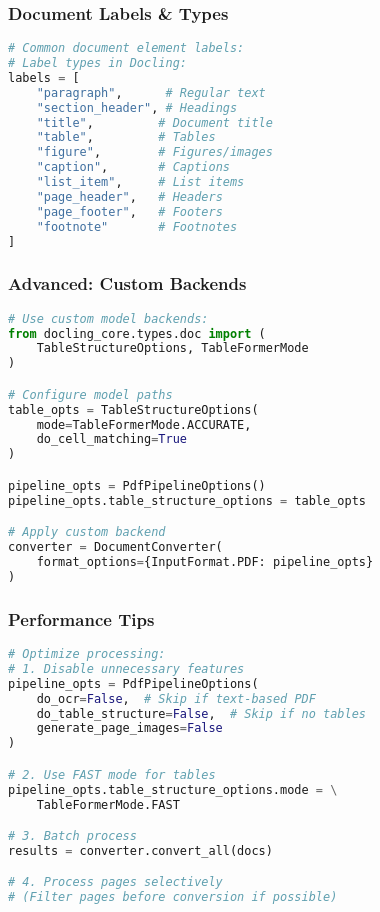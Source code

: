 \begin{frame}[fragile]\frametitle{Document Labels \& Types}
\begin{lstlisting}[language=python,basicstyle=\tiny]
# Common document element labels:
# Label types in Docling:
labels = [
    "paragraph",      # Regular text
    "section_header", # Headings
    "title",         # Document title
    "table",         # Tables
    "figure",        # Figures/images
    "caption",       # Captions
    "list_item",     # List items
    "page_header",   # Headers
    "page_footer",   # Footers
    "footnote"       # Footnotes
]
\end{lstlisting}
\end{frame}

\begin{frame}[fragile]\frametitle{Advanced: Custom Backends}
\begin{lstlisting}[language=python,basicstyle=\tiny]
# Use custom model backends:
from docling_core.types.doc import (
    TableStructureOptions, TableFormerMode
)

# Configure model paths
table_opts = TableStructureOptions(
    mode=TableFormerMode.ACCURATE,
    do_cell_matching=True
)

pipeline_opts = PdfPipelineOptions()
pipeline_opts.table_structure_options = table_opts

# Apply custom backend
converter = DocumentConverter(
    format_options={InputFormat.PDF: pipeline_opts}
)
\end{lstlisting}
\end{frame}

\begin{frame}[fragile]\frametitle{Performance Tips}
\begin{lstlisting}[language=python,basicstyle=\tiny]
# Optimize processing:
# 1. Disable unnecessary features
pipeline_opts = PdfPipelineOptions(
    do_ocr=False,  # Skip if text-based PDF
    do_table_structure=False,  # Skip if no tables
    generate_page_images=False
)

# 2. Use FAST mode for tables
pipeline_opts.table_structure_options.mode = \
    TableFormerMode.FAST

# 3. Batch process
results = converter.convert_all(docs)

# 4. Process pages selectively
# (Filter pages before conversion if possible)
\end{lstlisting}
\end{frame}

